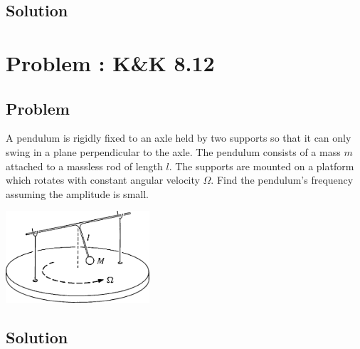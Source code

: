 \documentclass[solutions]{esg8012pset}
\begin{document}
\subsection{Solution}
\section{Problem \thesection: K\&K 8.12}
\subsection{Problem}
  A pendulum is rigidly fixed to an axle held by two supports so that it can only swing in a plane perpendicular to the axle. The pendulum consists of a mass $m$ attached to a massless rod of length $l$. The supports are mounted on a platform which rotates with constant angular velocity $\Omega$. Find the pendulum's frequency assuming the amplitude is small.
  \begin{center}\includegraphics[width=0.4\textwidth]{ps11_4}\end{center}
\subsection{Solution}
\end{document}
